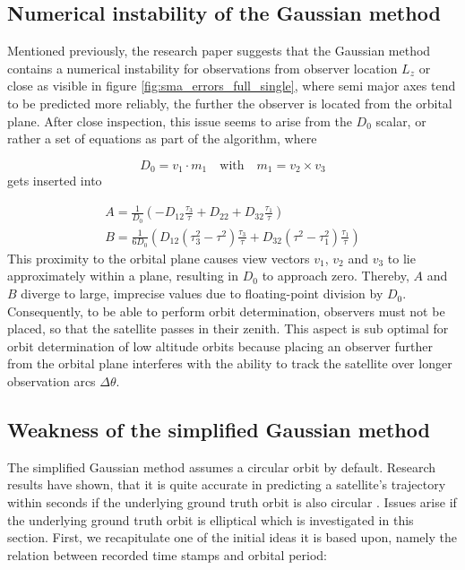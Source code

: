 \documentclass[11pt,a4paper]{article}
\begin{document}
	\subsection{Numerical instability of the Gaussian method}
	Mentioned previously, the research paper suggests that the Gaussian method contains a numerical instability for observations from observer location $L_z$ or close \cite{orbit_determination_research} as visible in figure \ref{fig:sma_errors_full_single}, where semi major axes tend to be predicted more reliably, the further the observer is located from the orbital plane.
	After close inspection, this issue seems to arise from the $D_0$ scalar, or rather a set of equations as part of the algorithm, where
	
	\begin{equation*}
		D_0=v_1\cdot m_1 \quad\text{with}\quad m_1=v_2\times v_3
	\end{equation*}
	gets inserted into
	
	\begin{equation*}
		\begin{aligned}
			A = \frac{1}{D_0}
			\left(
			-D_{12}\frac{\tau_3}{\tau}
			+ D_{22}
			+ D_{32}\frac{\tau_1}{\tau}
			\right) \\
			B = \frac{1}{6D_0}
			\left(
			D_{12}\left(\tau_3^2-\tau^2\right)\frac{\tau_3}{\tau}
			+
			D_{32}\left(\tau^2-\tau_1^2\right)\frac{\tau_1}{\tau}
			\right)
		\end{aligned}
	\end{equation*}
	\cite{curtis_gauss_algo}
	\newline
	This proximity to the orbital plane causes view vectors $v_1$, $v_2$ and $v_3$ to lie approximately within a plane, resulting in $D_0$ to approach zero. Thereby,  $A$ and $B$ diverge to large, imprecise values due to floating-point division by $D_0$.\newline
	Consequently, to be able to perform orbit determination, observers must not be placed, so that the satellite passes in their zenith. This aspect is sub optimal for orbit determination of low altitude orbits because placing an observer further from the orbital plane interferes with the ability to track the satellite over longer observation arcs $\Delta \theta$.
	
	\newpage
	\subsection{Weakness of the simplified Gaussian method}
	\label{weakness_sg}
	The simplified Gaussian method assumes a circular orbit by default. Research results have shown, that it is quite accurate in predicting a satellite's trajectory within seconds if the underlying ground truth orbit is also circular \cite{orbit_determination_research}. Issues arise if the underlying ground truth orbit is elliptical which is investigated in this section. First, we recapitulate one of the initial ideas it is based upon, namely the relation between recorded time stamps and orbital period:
	
\end{document}
